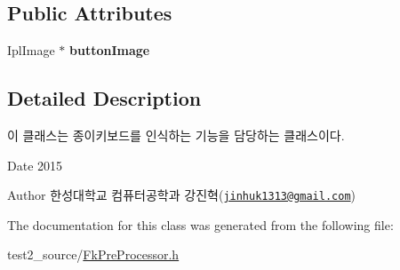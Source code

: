 \subsection*{Public Attributes}
\begin{DoxyCompactItemize}
\item 
\hypertarget{class_fk_paper_keyboard_recognizer_a10613be82eff8a7d072d77e784e941a0}{}Ipl\+Image $\ast$ {\bfseries button\+Image}\label{class_fk_paper_keyboard_recognizer_a10613be82eff8a7d072d77e784e941a0}

\end{DoxyCompactItemize}


\subsection{Detailed Description}
이 클래스는 종이키보드를 인식하는 기능을 담당하는 클래스이다. 

\begin{DoxyDate}{Date}
2015 
\end{DoxyDate}
\begin{DoxyAuthor}{Author}
한성대학교 컴퓨터공학과 강진혁(\href{mailto:jinhuk1313@gmail.com}{\tt jinhuk1313@gmail.\+com}) 
\end{DoxyAuthor}


The documentation for this class was generated from the following file\+:\begin{DoxyCompactItemize}
\item 
test2\+\_\+source/\hyperlink{_fk_pre_processor_8h}{Fk\+Pre\+Processor.\+h}\end{DoxyCompactItemize}

